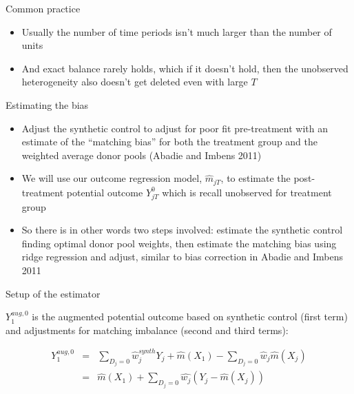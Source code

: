 \documentclass{beamer}
\begin{document}
\begin{frame}{Common practice}

\begin{itemize}
\item Usually the number of time periods isn't much larger than the number of units
\item And exact balance rarely holds, which if it doesn't hold, then the unobserved heterogeneity also doesn't get deleted even with large $T$
\end{itemize}

\end{frame}

\begin{frame}{Estimating the bias}

\begin{itemize}
\item Adjust the synthetic control to adjust for poor fit pre-treatment with an estimate of the ``matching bias'' for both the treatment group and the weighted average donor pools (Abadie and Imbens 2011)
\item We will use our outcome regression model, $\widehat{m}_{jT}$, to estimate the post-treatment potential outcome $Y_{jT}^0$ which is recall unobserved for treatment group
\item So there is in other words two steps involved: estimate the synthetic control finding optimal donor pool weights, then estimate the matching bias using ridge regression and adjust, similar to bias correction in Abadie and Imbens 2011
\end{itemize}


\end{frame}




\begin{frame}{Setup of the estimator}

$Y_1^{aug,0}$ is the augmented potential outcome based on synthetic control (first term) and adjustments for matching imbalance (second and third terms):

\begin{eqnarray*}
Y_1^{aug,0} &=& \sum_{D_j=0} \widehat{w}_j^{synth} Y_{j} + \widehat{m}(X_1) - \sum_{D_j=0} \widehat{w}_j \widehat{m}(X_j) \\
&=& \widehat{m}(X_1) + \sum_{D_j=0} \widehat{w_j}(Y_j - \widehat{m}(X_j))
\end{eqnarray*}

\end{frame}
\end{document}
